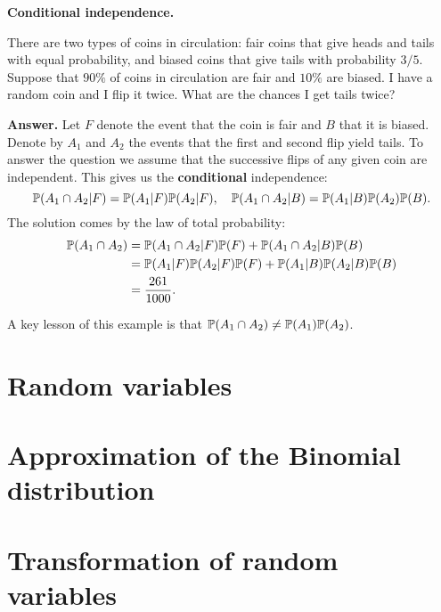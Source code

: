 \textbf{Conditional independence.}
\begin{example}
  There are two types of coins in circulation: fair coins that give heads and tails with equal probability, and biased coins that give tails with probability $3/5$. Suppose that $90\%$ of coins in circulation are fair and $10\%$ are biased. I have a random coin and I flip it twice. What are the chances I get tails twice?
\end{example}
\textbf{Answer.} Let $F$ denote the event that the coin is fair and $B$ that it is biased. Denote by $A_1$ and $A_2$ the events that the first and second flip yield tails. To answer the question we assume that the successive flips of any given coin are independent. This gives us the \textbf{conditional} independence:
\[
  \mathbb{P}(A_1\cap A_2|F) = \mathbb{P}(A_1|F)\mathbb{P}(A_2|F), \quad\mathbb{P}(A_1\cap A_2|B) =
  \mathbb{P}(A_1|B)\mathbb{P}(A_2)\mathbb{P}(B).
\]
The solution comes by the law of total probability:
\begin{align*}
  \mathbb{P}(A_1\cap A_2) & = \mathbb{P}(A_1\cap A_2|F) \mathbb{P}(F)+ \mathbb{P}(A_1\cap A_2|B)\mathbb{P}(B)\\
                   & = \mathbb{P}(A_1|F)\mathbb{P}(A_2|F)\mathbb{P}(F) + \mathbb{P}(A_1|B)\mathbb{P}(A_2|B)\mathbb{P}(B)\\
                   & = \frac{261}{1000}.
\end{align*}
\begin{remark}
  A key lesson of this example is that $\mathbb{P}(A_1\cap A_2) \neq\mathbb{P}(A_1)\mathbb{P}(A_2)$.
\end{remark}

\section{Random variables}
\label{sec:random-variables}


\section{Approximation of the Binomial distribution}
\label{sec:appr-binom-distr}


\section{Transformation of random variables}
\label{sec:transf-rand-vari}


